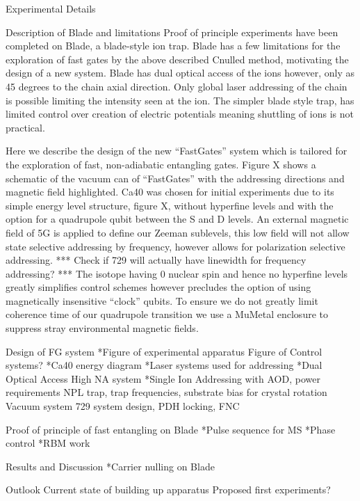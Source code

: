 Experimental Details

Description of Blade and limitations
Proof of principle experiments have been completed on Blade, a blade-style ion trap. Blade has a few limitations for the exploration of fast gates by the above described Cnulled method, motivating the design of a new system.
Blade has dual optical access of the ions however, only as 45 degrees to the chain axial direction. Only global laser addressing of the chain is possible limiting the intensity seen at the ion. The simpler blade style trap, has limited control over creation of electric potentials meaning shuttling of ions is not practical.

Here we describe the design of the new ``FastGates'' system which is
tailored for the exploration of fast, non-adiabatic entangling
gates. Figure X shows a schematic of the vacuum can of ``FastGates''
with the addressing directions and magnetic field highlighted. Ca40 was chosen for
initial experiments due to its simple energy level structure, figure
X, without hyperfine levels and with the option for a quadrupole qubit
between the S and D levels. An external magnetic field of 5G is applied to define our Zeeman sublevels, this low field will not allow state selective addressing by frequency, however allows for polarization selective addressing. *** Check if 729 will actually have linewidth for frequency addressing? ***
The isotope having 0 nuclear spin and
hence no hyperfine levels greatly simplifies control schemes however
precludes the option of using magnetically insensitive ``clock''
qubits. To ensure we do not greatly limit coherence time of our
quadrupole transition we use a MuMetal enclosure to suppress stray environmental magnetic fields.

    Design of FG system
        *Figure of experimental apparatus
        Figure of Control systems?
        *Ca40 energy diagram
        *Laser systems used for addressing 
        *Dual Optical Access High NA system
        *Single Ion Addressing with AOD, power requirements
        NPL trap, trap frequencies, substrate bias for crystal rotation
        Vacuum system
        729 system design, PDH locking, FNC

    Proof of principle of fast entangling on Blade
        *Pulse sequence for MS
        *Phase control
        *RBM work

Results and Discussion
    *Carrier nulling on Blade


Outlook
    Current state of building up apparatus
    Proposed first experiments?

  

